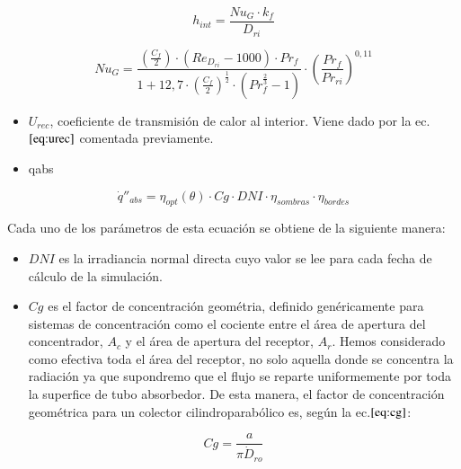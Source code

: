 \begin{equation}
    h_{int} = \frac{Nu_{G}\cdot k_f }{D_{ri}}
    \label{eq:hint}
\end{equation}

\begin{equation}
    Nu_{G} = \frac{ \left( \frac{C_f}{2} \right)\cdot\left( Re_{D_{ri}} - 1000 \right)\cdot Pr_f }{1 + 12,7 \cdot \left(\frac{C_f}{2} \right)^{\frac{1}{2}}\cdot \left(Pr^{\frac{2}{3}}_f -1 \right)} \cdot \left( \frac{Pr_f}{Pr_{ri}} \right)^{0,11}
    \label{eq:nug}
\end{equation}

\begin{itemize}
\item
  \(U_{rec}\), coeficiente de transmisión de calor al interior. Viene   dado por la ec.\(\eqref{eq:urec}\) comentada previamente. 
\item
qabs
\end{itemize}

\begin{equation}
\dot q''_{abs}= \eta_{opt}(\theta) \cdot Cg \cdot DNI \cdot \eta_{sombras} \cdot \eta_{bordes} 
\end{equation}

Cada uno de los parámetros de esta ecuación se obtiene de la siguiente manera:

\begin{itemize}
\item
  \(DNI\) es la irradiancia normal directa cuyo valor se lee para cada   fecha de cálculo de la simulación.
\item
  \(Cg\) es el factor de concentración geométria, definido genéricamente   para sistemas de concentración como el cociente entre el área de   apertura del concentrador, \(A_c\) y el área de apertura del receptor,   \(A_r\). Hemos considerado como efectiva toda el área del receptor, no   solo aquella donde se concentra la radiación ya que supondremo que el   flujo se reparte uniformemente por toda la superfice de tubo   absorbedor. De esta manera, el factor de concentración geométrica para   un colector cilindroparabólico es, según la ec.\(\eqref{eq:cg}\):
\end{itemize}

\begin{equation}
   Cg = \frac{a}{\pi \dot D_{ro}}
    \label{eq:cg}
\end{equation}

